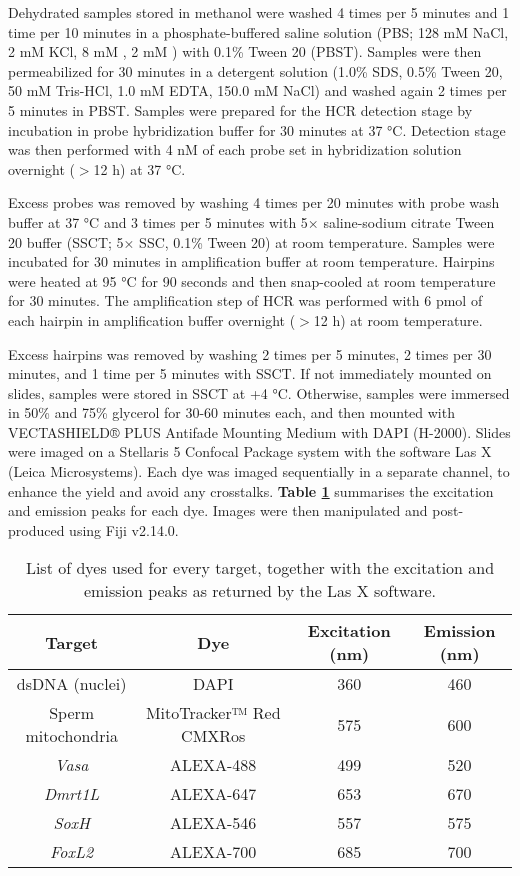 \documentclass[../main.tex]{subfiles}
\begin{document}
Dehydrated samples stored in methanol were washed 4 times per 5 minutes and 1 time per 10 minutes in a phosphate-buffered saline solution (PBS; 128 mM NaCl, 2 mM KCl, 8 mM , 2 mM ) with 0.1\% Tween 20 (PBST). Samples were then permeabilized for 30 minutes in a detergent solution (1.0\% SDS, 0.5\% Tween 20, 50 mM Tris-HCl, 1.0 mM EDTA, 150.0 mM NaCl) and washed again 2 times per 5 minutes in PBST. Samples were prepared for the HCR detection stage by incubation in probe hybridization buffer for 30 minutes at 37 °C. Detection stage was then performed with 4 nM of each probe set in hybridization solution overnight ($>$12 h) at 37 °C.

Excess probes was removed by washing 4 times per 20 minutes with probe wash buffer at 37 °C and 3 times per 5 minutes with 5× saline-sodium citrate Tween 20 buffer (SSCT; 5× SSC, 0.1\% Tween 20) at room temperature. Samples were incubated for 30 minutes in amplification buffer at room temperature. Hairpins were heated at 95 °C for 90 seconds and then snap-cooled at room temperature for 30 minutes. The amplification step of HCR was performed with 6 pmol of each hairpin in amplification buffer overnight ($>$12 h) at room temperature.

Excess hairpins was removed by washing 2 times per 5 minutes, 2 times per 30 minutes, and 1 time per 5 minutes with SSCT. If not immediately mounted on slides, samples were stored in SSCT at +4 °C. Otherwise, samples were immersed in 50\% and 75\% glycerol for 30-60 minutes each, and then mounted with VECTASHIELD® PLUS Antifade Mounting Medium with DAPI (H-2000). Slides were imaged on a Stellaris 5 Confocal Package system with the software Las X (Leica Microsystems). Each dye was imaged sequentially in a separate channel, to enhance the yield and avoid any crosstalks. \textbf{Table \ref{tab:imaging}} summarises the excitation and emission peaks for each dye. Images were then manipulated and post-produced using Fiji v2.14.0.

\begin{table}
    \centering
    \begin{tabular}{c c c c}
         \hline
         \textbf{Target} & \textbf{Dye} & \textbf{Excitation (nm)} & \textbf{Emission (nm)} \\
         \hline
         dsDNA (nuclei) & DAPI & 360 & 460 \\
         Sperm mitochondria & MitoTracker™ Red CMXRos & 575 & 600 \\
         \textit{Vasa} & ALEXA-488 & 499 & 520 \\
         \textit{Dmrt1L} & ALEXA-647 & 653 & 670 \\
         \textit{SoxH} & ALEXA-546 & 557 & 575 \\
         \textit{FoxL2} & ALEXA-700 & 685 & 700 \\
         \hline
    \end{tabular}
    \caption{List of dyes used for every target, together with the excitation and emission peaks as returned by the Las X software.}
    \label{tab:imaging}
\end{table}
\end{document}
